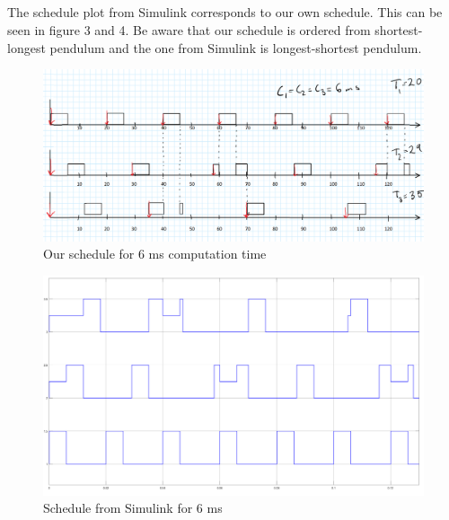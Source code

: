 \documentclass[12pt,a4paper]{article}
\begin{document}
   

\subsection{}%

The schedule plot from Simulink corresponds to our own schedule. This
can be seen in figure 3 and 4. Be aware that our schedule is ordered
from shortest-longest pendulum and the one from Simulink is
longest-shortest pendulum.
    \begin{center}
      \begin{figure}[H]
      \centering
        \includegraphics[scale=0.3]{ex41.png}
        \caption{Our schedule for 6 ms computation time}
        \label{fig:ex41}
     \end{figure}
    \end{center}
    
    \begin{center}
     \begin{figure}[H]
      \centering
        \includegraphics[scale=0.2]{ex42.png}
      \caption{Schedule from Simulink for 6 ms}
        \label{fig:ex32}
      \end{figure}
    \end{center}
\end{document}
